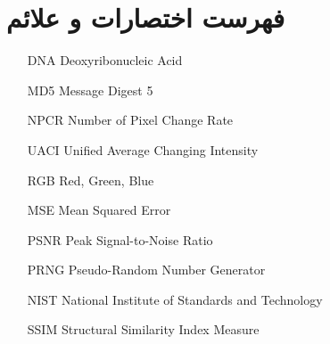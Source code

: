 \chapter*{فهرست اختصارات و علائم}
\begin{latin}
\begin{itemize}
    \item[DNA] Deoxyribonucleic Acid
    \item[MD5] Message Digest 5
    \item[NPCR] Number of Pixel Change Rate
    \item[UACI] Unified Average Changing Intensity
    \item[RGB] Red, Green, Blue
    \item[MSE] Mean Squared Error
    \item[PSNR] Peak Signal-to-Noise Ratio
    \item[PRNG] Pseudo-Random Number Generator
    \item[NIST] National Institute of Standards and Technology
    \item[SSIM] Structural Similarity Index Measure
\end{itemize}
\end{latin}
\newpage